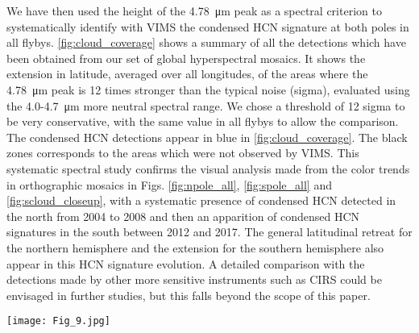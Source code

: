 \documentclass[preprint,twocolumn,5p,authoryear,compress,colorlinks=true]{elsarticle}
\newcommand{\figref}[1]{\autoref{fig:#1}}
\begin{document}
We have then used the height of the \SI{4.78}{\um} peak as a spectral criterion to systematically identify with VIMS the condensed HCN signature at both poles in all flybys. \figref{cloud_coverage} shows a summary of all the detections which have been obtained from our set of global hyperspectral mosaics. It shows the extension in latitude, averaged over all longitudes, of the areas where the \SI{4.78}{\um} peak is 12 times stronger than the typical noise (sigma), evaluated using the \num{4.0}-\SI{4.7}{\um} more neutral spectral range. We chose a threshold of 12 sigma to be very conservative, with the same value in all flybys to allow the comparison. The condensed HCN detections appear in blue in \figref{cloud_coverage}. The black zones corresponds to the areas which were not observed by VIMS. This systematic spectral study confirms the visual analysis made from the color trends in orthographic mosaics in Figs. \autoref{fig:npole_all}, \ref{fig:spole_all} and \ref{fig:scloud_closeup}, with a systematic presence of condensed HCN detected in the north from 2004 to 2008 and then an apparition of condensed HCN signatures in the south between 2012 and 2017. The general latitudinal retreat for the northern hemisphere and the extension for the southern hemisphere also appear in this HCN signature evolution. A detailed comparison with the detections made by other more sensitive instruments such as CIRS could be envisaged in further studies, but this falls beyond the scope of this paper.


\begin{figure*}[!ht]
\texttt{[image: Fig\_9.jpg]}
\caption{Spectral detection (in blue) of the 4.78 μm condensed HCN peak with VIMS during all targeted Titan flybys from 2004 to 2017. HCN Spectral features are found over the north pole between 2004 and 2008, and then appear over the south pole from 2012 to 2017.}
\label{fig:cloud_coverage}
\end{figure*}
\end{document}
